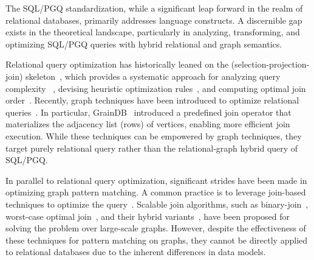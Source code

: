 The SQL/PGQ standardization, while a significant leap forward in the realm of relational databases, primarily addresses language constructs. A discernible gap exists in the theoretical landscape, particularly in analyzing, transforming, and optimizing SQL/PGQ queries with hybrid relational and graph semantics. %

Relational query optimization has historically leaned on the \spj (selection-projection-join) skeleton~\cite{spj,Chaudhuri98}, which provides a systematic approach for analyzing query complexity~\cite{IbarakiK84,ChatterjiEGY02} , devising heuristic optimization rules~\cite{Chaudhuri99heuristics,goldsteinheuristics}, and
computing optimal join order~\cite{Haffnerjoinorder,chenjoinorder}. Recently, graph techniques have been introduced to optimize relational queries~\cite{wanderjoin,Haffnerjoinorder,gqfast,graindb}. %
In particular, GrainDB~\cite{graindb} introduced a predefined join operator that materializes the adjacency list (rows) of vertices, enabling more efficient join execution. While these techniques can be empowered by graph techniques, they target purely relational query rather than the relational-graph hybrid query of SQL/PGQ.

In parallel to relational query optimization, significant strides have been made in optimizing graph pattern matching.
A common practice is to
leverage join-based techniques to optimize the query~\cite{lai2019distributed,lai2015scalable,ammar2018distributed,huge}. Scalable join algorithms, such as binary-join~\cite{lai2015scalable}, worst-case optimal join~\cite{ammar2018distributed}, and their hybrid variants~\cite{mhedhbi2019optimizing,huge,GLogS}, have been proposed for solving the problem over large-scale graphs. However, despite the effectiveness of these techniques for pattern matching on graphs, they cannot be directly applied to relational databases due to the inherent differences in data models.

